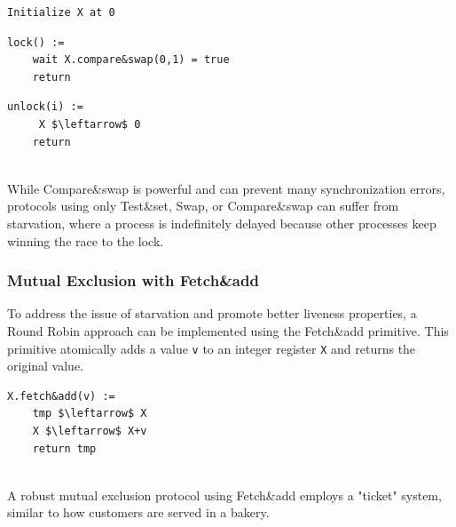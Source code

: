 \begin{minipage}{\textwidth}
\begin{lstlisting}[mathescape]
Initialize X at 0
\end{lstlisting}
\begin{minipage}{0.45\textwidth}
\begin{lstlisting}[mathescape]
lock() :=
    wait X.compare&swap(0,1) = true
    return
\end{lstlisting}
\end{minipage}
\hfill
\begin{minipage}{0.45\textwidth}
\begin{lstlisting}[mathescape]
unlock(i) :=
     X $\leftarrow$ 0
    return
\end{lstlisting}
\end{minipage}
\end{minipage}\\

While Compare\&swap is powerful and can prevent many synchronization errors, protocols using only Test\&set, Swap, or Compare\&swap can suffer from starvation, where a process is indefinitely delayed because other processes keep winning the race to the lock.

\subsubsection{Mutual Exclusion with Fetch\&add}
To address the issue of starvation and promote better liveness properties, a Round Robin approach can be implemented using the Fetch\&add primitive. This primitive atomically adds a value \texttt{v} to an integer register \texttt{X} and returns the original value.

\begin{minipage}{\textwidth}
\begin{lstlisting}[mathescape]
X.fetch&add(v) :=
    tmp $\leftarrow$ X
    X $\leftarrow$ X+v
    return tmp
\end{lstlisting}
\end{minipage}\\

A robust mutual exclusion protocol using Fetch\&add employs a "ticket" system, similar to how customers are served in a bakery.

